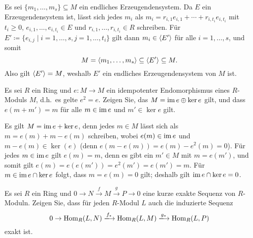 \begin{solution}
  Es sei $\{m_1, \dotsc, m_s\} \subseteq M$ ein endliches Erzeugendensystem.
  Da $E$ ein Erzeugendensystem ist, lässt sich jedes $m_i$ als $m_i = r_{i,1} e_{i,1} + \dotsb + r_{i,t_i} e_{i,t_i}$ mit $t_i \geq 0$, $e_{i,1}, \dotsc, e_{i,t_i} \in E$ und $r_{i,1}, \dotsc, r_{i,t_i} \in R$ schreiben.
  Für $E' \coloneqq \{e_{i,j} \mid i = 1, \dotsc, s, j = 1, \dotsc, t_i\}$ gilt dann $m_i \in \langle E'\rangle$ für alle $i = 1, \dotsc, s$, und somit
  \[
              M
    =         \langle m_1, \dotsc, m_s\rangle
    \subseteq \langle E'\rangle
    \subseteq M.
  \]
  Also gilt $\langle E'\rangle = M$, weshalb $E'$ ein endliches Erzeugendensystem von $M$ ist.
\end{solution}


\begin{question}[subtitle = Idempotente]
  Es sei $R$ ein Ring und $e \colon M \to M$ ein idempotenter Endomorphismus eines $R$-Moduls $M$, d.h.\ es gelte $e^2 = e$.
  Zeigen Sie, das $M = \operatorname{im} e \oplus \ker e$ gilt, und dass $e(m + m') = m$ für alle $m \in \operatorname{im} e$ und $m' \in \ker e$ gilt.
\end{question}


\begin{solution}
  Es gilt $M = \operatorname{im} e + \ker e$, denn jedes $m \in M$ lässt sich als $m = e(m) + m - e(m)$ schreiben, wobei $e(m) \in \operatorname{im} e$ und $m - e(m) \in \ker(e)$ (denn $e(m - e(m)) = e(m) - e^2(m) = 0$).
  Für jedes $m \in \operatorname{im} e$ gilt $e(m) = m$, denn es gibt ein $m' \in M$ mit $m = e(m')$, und somit gilt $e(m) = e(e(m')) = e^2(m') = e(m') = m$.
  Für $m \in \operatorname{im} e \cap \ker e$ folgt, dass $m = e(m) = 0$ gilt;
  deshalb gilt $\operatorname{im} e \cap \ker e = 0$.
\end{solution}


\begin{question}[subtitle = Linksexaktheit von $\Hom$]
  \label{question: Hom is left exact}
  Es sei $R$ ein Ring und $0 \to N \xrightarrow{f} M \xrightarrow{g} P \to 0$ eine kurze exakte Sequenz von $R$-Moduln.
  Zeigen Sie, dass für jeden $R$-Modul $L$ auch die induzierte Sequenz
  \[
                          0
    \to                   \Hom_R(L,N)
    \xlongrightarrow{f_*} \Hom_R(L,M)
    \xlongrightarrow{g_*} \Hom_R(L,P)
  \]
  exakt ist.
\end{question}


